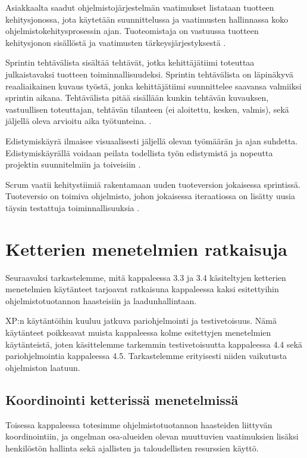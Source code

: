 \documentclass[finnish]{tktltiki2}
\theoremstyle{definition}
\theoremstyle{remark}
\begin{document}
Asiakkaalta saadut ohjelmistojärjestelmän vaatimukset listataan tuotteen kehitysjonossa, jota käytetään suunnittelussa ja vaatimusten hallinnassa koko ohjelmistokehitysprosessin ajan. Tuoteomistaja on vastuussa tuotteen kehitysjonon sisällöstä ja vaatimusten tärkeysjärjestyksestä \cite{SCH09}.

Sprintin tehtävälista sisältää tehtävät, jotka kehittäjätiimi toteuttaa  julkaistavaksi tuotteen toiminnallisuudeksi. Sprintin tehtävälista on läpinäkyvä reaaliaikainen kuvaus työstä, jonka kehittäjätiimi suunnittelee saavansa valmiiksi sprintin aikana. Tehtävälista pitää sisällään kunkin tehtävän kuvauksen, vastuullisen toteuttajan, tehtävän tilanteen (ei aloitettu, kesken, valmis), sekä jäljellä oleva arvioitu aika työtunteina. \cite{SCH09}.

Edistymiskäyrä ilmaisee visuaalisesti jäljellä olevan työmäärän ja ajan suhdetta. Edistymiskäyrällä voidaan peilata todellista työn edistymistä ja nopeutta projektin suunnitelmiin ja toiveisiin \cite{SCH09}.

Scrum vaatii kehitystiimiä rakentamaan uuden tuoteversion jokaisessa sprintissä. Tuoteversio on toimiva ohjelmisto, johon jokaisessa iteraatiossa on lisätty uusia täysin testattuja toiminnallisuuksia \cite{SCH09}.

\section{Ketterien menetelmien ratkaisuja}

Seuraavaksi tarkastelemme, mitä kappaleessa 3.3 ja 3.4 käsiteltyjen ketterien menetelmien käytänteet tarjoavat ratkaisuna kappaleessa kaksi esitettyihin ohjelmistotuotannon haasteisiin ja laadunhallintaan.

XP:n käytäntöihin kuuluu jatkuva pariohjelmointi ja testivetoisuus. Nämä käytänteet poikkeavat muista kappaleessa kolme esitettyjen menetelmien käytänteistä, joten käsittelemme tarkemmin testivetoisuutta kappaleessa 4.4 sekä pariohjelmointia kappaleessa 4.5. Tarkastelemme erityisesti niiden vaikutusta ohjelmiston laatuun.  

\subsection{Koordinointi ketterissä menetelmissä}

Toisessa kappaleessa totesimme ohjelmistotuotannon haasteiden liittyvän koordinointiin, ja ongelman osa-alueiden olevan muuttuvien vaatimuksien lisäksi henkilöstön hallinta sekä ajallisten ja taloudellisten resurssien käyttö. 
\end{document}
